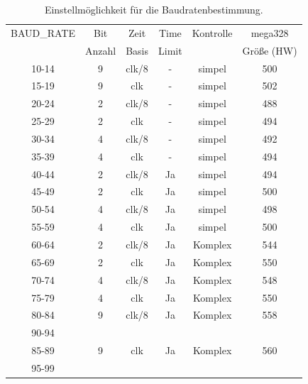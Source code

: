 \begin{table}[H]
  \begin{center}
    \begin{tabular}{| c | c | c | c | c | c |}
    \hline
	    BAUD\_RATE  & Bit    & Zeit  & Time  & Kontrolle & mega328 \\
			& Anzahl & Basis & Limit &           & Größe (HW)\\
    \hline
    \hline
	    10-14      &  9     & clk/8 &   -  & simpel   & 500  \\
    \hline
	    15-19      &  9     & clk   &   -  & simpel   & 502  \\
    \hline
	    20-24      &  2     & clk/8 &   -  & simpel   & 488  \\
    \hline
	    25-29      &  2     &  clk  &   -  & simpel   & 494  \\
    \hline
	    30-34      &  4     & clk/8 &   -  & simpel   & 492  \\
    \hline
	    35-39      &  4     &  clk  &   -  & simpel   & 494  \\
    \hline
	    40-44      &  2     & clk/8 &  Ja  & simpel   & 494  \\
    \hline
	    45-49      &  2     &  clk  &  Ja  & simpel   & 500  \\
    \hline
	    50-54      &  4     & clk/8 &  Ja  & simpel   & 498  \\
    \hline
	    55-59      &  4     &  clk  &  Ja  & simpel   & 500  \\
    \hline
    \hline
	    60-64      &  2     & clk/8 &  Ja  & Komplex  & 544  \\
    \hline
	    65-69      &  2     & clk   &  Ja  & Komplex  & 550  \\
    \hline
	    70-74      &  4     & clk/8 &  Ja  & Komplex  & 548  \\
    \hline
	    75-79      &  4     & clk   &  Ja  & Komplex  & 550  \\
    \hline
	    80-84      &  9     & clk/8 &  Ja  & Komplex  & 558  \\
	    90-94      &        &       &      &          &     \\
    \hline 
	    85-89      &  9     & clk   &  Ja  & Komplex  & 560 \\
	    95-99      &        &       &      &          &     \\
    \hline
    \end{tabular}
  \end{center}
  \caption{Einstellmöglichkeit für die Baudratenbestimmung.}
  \label{tab:AutoBaudControl}
\end{table}

